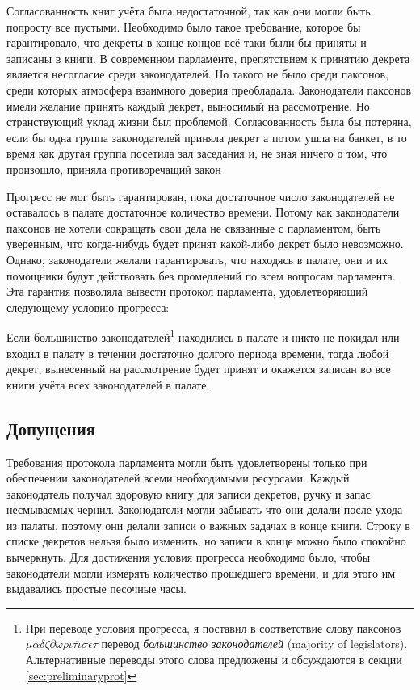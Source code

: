 \documentclass[12pt, a4paper]{article} %
\begin{document}
Согласованность книг учёта была недостаточной, так как они могли быть попросту все пустыми. Необходимо было такое требование, которое бы гарантировало, что декреты в конце концов всё-таки были бы приняты и записаны в книги. В современном парламенте, препятствием к принятию декрета является несогласие среди законодателей. Но такого не было среди паксонов, среди которых  атмосфера взаимного доверия преобладала. Законодатели паксонов имели желание принять каждый декрет, выносимый на рассмотрение. Но странствующий уклад жизни был проблемой. Согласованность была бы потеряна, если бы одна группа законодателей приняла декрет 
а потом ушла на банкет, в то время как другая группа посетила зал заседания и, не зная ничего о том, что произошло, приняла противоречащий закон 

Прогресс не мог быть гарантирован, пока достаточное число законодателей не оставалось в палате достаточное количество времени. Потому как законодатели паксонов не хотели сокращать свои дела не связанные с парламентом, быть уверенным, что когда-нибудь будет принят какой-либо декрет было невозможно. Однако, законодатели желали гарантировать, что находясь в палате, они и их помощники будут действовать без промедлений по всем вопросам парламента. Эта гарантия позволяла вывести протокол парламента, удовлетворяющий следующему условию прогресса:

    Если большинство законодателей\footnote{При переводе условия прогресса, я поставил в соответствие слову паксонов $\mu\alpha\delta\zeta\partial\omega\rho\iota\tau\check{\iota}\sigma\epsilon\tau$ перевод \textit{большинство законодателей} (majority of legislators). Альтернативные переводы этого слова предложены и обсуждаются в секции \ref{sec:preliminaryprot}} находились в палате и никто не покидал или входил в палату в течении достаточно долгого периода времени, тогда любой декрет, вынесенный на рассмотрение будет принят и окажется записан во все книги учёта всех законодателей в палате.

\subsection{Допущения}

Требования протокола парламента могли быть удовлетворены только при обеспечении законодателей всеми необходимыми ресурсами. Каждый законодатель получал здоровую книгу для записи декретов, ручку и запас несмываемых чернил. Законодатели могли забывать что они делали после ухода из палаты, поэтому они делали записи о важных задачах в конце книги. Строку в списке декретов нельзя было изменить, но записи в конце можно было спокойно вычеркнуть. Для достижения условия прогресса необходимо было, чтобы законодатели могли измерять количество прошедшего времени, и для этого им выдавались простые песочные часы.
\end{document}
